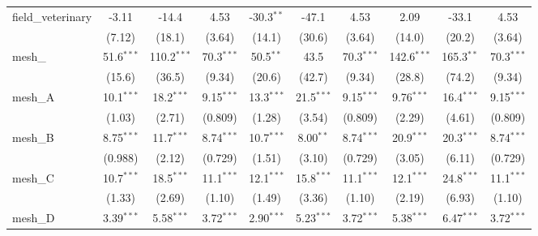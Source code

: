 \begin{tabular}{lccccccccc}
   field\_veterinary                                           & -3.11         & -14.4         & 4.53          & -30.3$^{**}$ & -47.1        & 4.53          & 2.09           & -33.1          & 4.53\\   
                                                               & (7.12)        & (18.1)        & (3.64)        & (14.1)       & (30.6)       & (3.64)        & (14.0)         & (20.2)         & (3.64)\\   
   mesh\_                                                      & 51.6$^{***}$  & 110.2$^{***}$ & 70.3$^{***}$  & 50.5$^{**}$  & 43.5         & 70.3$^{***}$  & 142.6$^{***}$  & 165.3$^{**}$   & 70.3$^{***}$\\   
                                                               & (15.6)        & (36.5)        & (9.34)        & (20.6)       & (42.7)       & (9.34)        & (28.8)         & (74.2)         & (9.34)\\   
   mesh\_A                                                     & 10.1$^{***}$  & 18.2$^{***}$  & 9.15$^{***}$  & 13.3$^{***}$ & 21.5$^{***}$ & 9.15$^{***}$  & 9.76$^{***}$   & 16.4$^{***}$   & 9.15$^{***}$\\   
                                                               & (1.03)        & (2.71)        & (0.809)       & (1.28)       & (3.54)       & (0.809)       & (2.29)         & (4.61)         & (0.809)\\   
   mesh\_B                                                     & 8.75$^{***}$  & 11.7$^{***}$  & 8.74$^{***}$  & 10.7$^{***}$ & 8.00$^{**}$  & 8.74$^{***}$  & 20.9$^{***}$   & 20.3$^{***}$   & 8.74$^{***}$\\   
                                                               & (0.988)       & (2.12)        & (0.729)       & (1.51)       & (3.10)       & (0.729)       & (3.05)         & (6.11)         & (0.729)\\   
   mesh\_C                                                     & 10.7$^{***}$  & 18.5$^{***}$  & 11.1$^{***}$  & 12.1$^{***}$ & 15.8$^{***}$ & 11.1$^{***}$  & 12.1$^{***}$   & 24.8$^{***}$   & 11.1$^{***}$\\   
                                                               & (1.33)        & (2.69)        & (1.10)        & (1.49)       & (3.36)       & (1.10)        & (2.19)         & (6.93)         & (1.10)\\   
   mesh\_D                                                     & 3.39$^{***}$  & 5.58$^{***}$  & 3.72$^{***}$  & 2.90$^{***}$ & 5.23$^{***}$ & 3.72$^{***}$  & 5.38$^{***}$   & 6.47$^{***}$   & 3.72$^{***}$\\   

\end{tabular}
